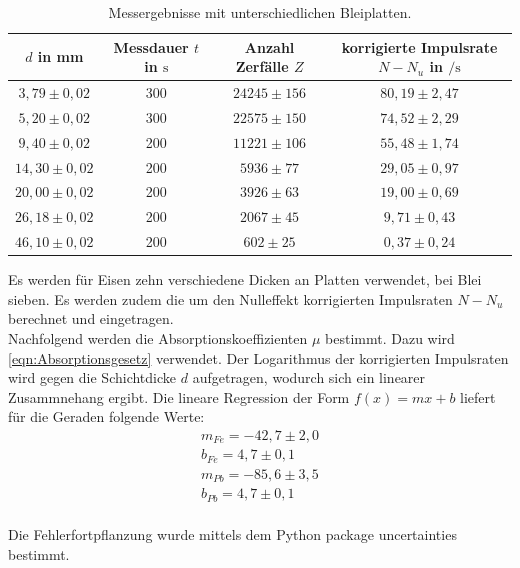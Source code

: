 \begin{table}
  \centering
  \caption{Messergebnisse mit unterschiedlichen Bleiplatten.}
  \label{tab:1aPb}
  \begin{tabular}{c c c c}
    $d$ in \si{\milli\meter} & Messdauer $t$ in $\si{\second}$ & Anzahl Zerfälle $Z$  &  korrigierte Impulsrate $N-N_u$ in $\si{\per\second}$\\
       \midrule
        $3,79 \pm 0,02$   &  300   &  $24245 \pm 156$ & $80,19 \pm 2,47$ \\
        $5,20 \pm 0,02$   &  300   &  $22575 \pm 150$ & $74,52 \pm 2,29$\\
        $9,40 \pm 0,02$   &  200   &  $11221 \pm 106$ & $55,48 \pm 1,74$\\
        $14,30 \pm 0,02$  &  200   &  $5936  \pm 77$ & $29,05 \pm 0,97$\\
        $20,00 \pm 0,02$  &  200   &  $3926  \pm 63$ & $19,00 \pm 0,69$\\
        $26,18 \pm 0,02$  &  200   &  $2067  \pm 45$ & $9,71 \pm 0,43$\\
        $46,10 \pm 0,02$  &  200   &  $602   \pm 25$ & $0,37 \pm 0,24$\\
      \bottomrule
    \end{tabular}
\end{table}

Es werden für Eisen zehn verschiedene Dicken an Platten verwendet, bei Blei sieben. Es werden zudem 
die um den Nulleffekt korrigierten Impulsraten $N-N_u$ berechnet und eingetragen.\\
Nachfolgend werden die Absorptionskoeffizienten $ \mu $ bestimmt. Dazu wird \autoref{eqn:Absorptionsgesetz}
verwendet. Der Logarithmus der korrigierten Impulsraten wird gegen die Schichtdicke $d$ aufgetragen, wodurch sich
ein linearer Zusammnehang ergibt. Die lineare Regression der Form $f(x) = mx +b$ liefert für die Geraden folgende Werte:
\begin{align*}
  m_{Fe} = -42,7 \pm 2,0 \\
  b_{Fe} = 4,7 \pm 0,1 \\
  m_{Pb} = -85,6 \pm 3,5 \\
  b_{Pb} = 4,7 \pm 0,1 \\
\end{align*}

Die Fehlerfortpflanzung wurde mittels dem Python package uncertainties bestimmt. \cite{unc}

